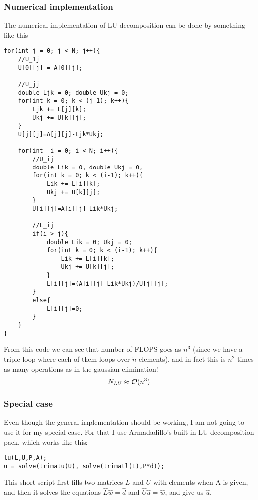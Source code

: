 \documentclass{scrartcl}
\begin{document}
\subsubsection{Numerical implementation}
The numerical implementation of LU decomposition can be done by something like this
\begin{lstlisting}
for(int j = 0; j < N; j++){
	//U_1j
    U[0][j] = A[0][j];
    
    //U_jj
    double Ljk = 0; double Ukj = 0;
    for(int k = 0; k < (j-1); k++){
        Ljk += L[j][k];
        Ukj += U[k][j];
    }
    U[j][j]=A[j][j]-Ljk*Ukj;
    
    for(int  i = 0; i < N; i++){
        //U_ij
        double Lik = 0; double Ukj = 0;
        for(int k = 0; k < (i-1); k++){
            Lik += L[i][k];
            Ukj += U[k][j];
        }
        U[i][j]=A[i][j]-Lik*Ukj;

        //L_ij
        if(i > j){
            double Lik = 0; Ukj = 0;
            for(int k = 0; k < (i-1); k++){
                Lik += L[i][k];
                Ukj += U[k][j];
            }
            L[i][j]=(A[i][j]-Lik*Ukj)/U[j][j];
        }
        else{
            L[i][j]=0;
        }
    }
}
\end{lstlisting}
From this code we can see that number of FLOPS goes as $n^3$ (since we have a triple loop where each of them loops over $\tilde n$ elements), and in fact this is $n^2$ times as many operations as in the gaussian elimination! 
$$N_{LU}\approx {\cal O}(n^3)$$

\subsubsection{Special case}
Even though the general implementation should be working, I am not going to use it for my special case. For that I use Armadadillo's built-in LU decomposition pack, which works like this:
\begin{lstlisting}
lu(L,U,P,A);
u = solve(trimatu(U), solve(trimatl(L),P*d));
\end{lstlisting}
This short script first fills two matrices $L$ and $U$ with elements when A is given, and then it solves the equations $\hat{L}\hat{w}=\hat{d}$ and $\hat{U}\hat{u}=\hat{w}$, and give us $\hat{u}$.
\end{document}
